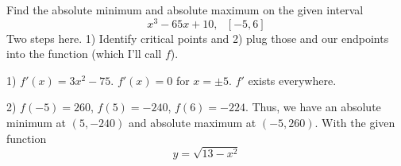 \documentclass[11pt]{exam}
\begin{document}
\begin{questions}

\addpoints\question[3] Find the absolute minimum and absolute maximum on the given interval $$x^3-65x+10,\:\:\:[-5,6]$$
\vspace{3em}\indent Two steps here. 1) Identify critical points and 2) plug those and our endpoints into the function (which I'll call $f$).

1) $f'(x)=3x^2-75$. $f'(x)=0$ for $x=\pm 5$. $f'$ exists everywhere.

2) $f(-5)=260$, $f(5)=-240$, $f(6)=-224$. Thus, we have an absolute minimum at $(5,-240)$ and absolute maximum at $(-5,260)$.
\newpage
\addpoints
\question With the given function $$y=\sqrt{13-x^2}$$
\end{questions}
\end{document}
